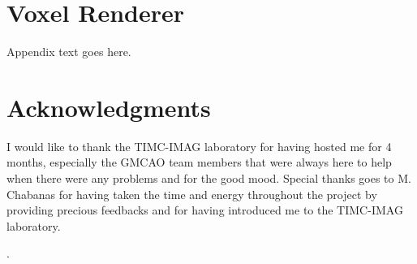 \documentclass[12pt,journal,compsoc]{IEEEtran}
\begin{document}
\appendices
\section{Voxel Renderer}
Appendix text goes here.

\section*{Acknowledgments}
I would like to thank the TIMC-IMAG laboratory for having hosted me for 4 months, especially the GMCAO team members that were always here to help when there were any problems and for the good mood. Special thanks goes to M. Chabanas for having taken the time and energy throughout the project by providing precious feedbacks and for having introduced me to the TIMC-IMAG laboratory.

\cite{1}\cite{2}\cite{3}\cite{4}\cite{5}\cite{6}\cite{7}.





\end{document}
